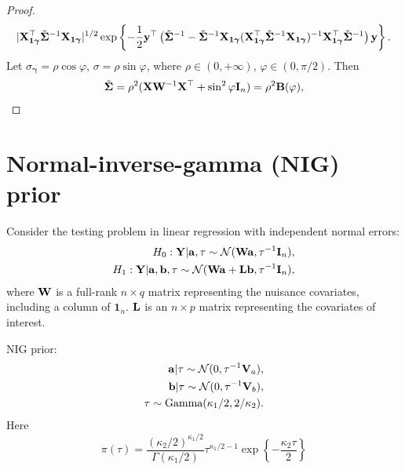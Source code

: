 \documentclass[11pt]{article}
\newcommand{\Ba}{\mathbf{a}}    \newcommand{\Bb}{\mathbf{b}}    \newcommand{\Bc}{\mathbf{c}}    \newcommand{\Bd}{\mathbf{d}}    \newcommand{\Be}{\mathbf{e}}    \newcommand{\Bf}{\mathbf{f}}    \newcommand{\Bg}{\mathbf{g}}    \newcommand{\Bh}{\mathbf{h}}    \newcommand{\Bi}{\mathbf{i}}    \newcommand{\Bj}{\mathbf{j}}    \newcommand{\Bk}{\mathbf{k}}    \newcommand{\Bl}{\mathbf{l}}
\newcommand{\By}{\mathbf{y}}    \newcommand{\Bz}{\mathbf{z}}
\newcommand{\BY}{\mathbf{Y}}    \newcommand{\BZ}{\mathbf{Z}}
\newcommand{\bfsym}[1]{\ensuremath{\boldsymbol{#1}}}
\def\bgamma{\bfsym \gamma}             \def\bGamma{\bfsym \Gamma}
\theoremstyle{plain}
\theoremstyle{definition}
\theoremstyle{remark}
\begin{document}
\begin{proof}
\begin{equation*}
\begin{split}
{|\BX_{\mathbf 1 \bgamma}^\top \tilde\bSigma^{-1} \BX_{\mathbf 1 \bgamma}|^{1/2}
}
\exp\left\{
    -\frac 1 2 
    \By^\top \left(
        \tilde\bSigma^{-1} -\tilde\bSigma^{-1} \BX_{\mathbf 1 \bgamma} (\BX_{\mathbf 1 \bgamma}^\top \tilde\bSigma^{-1} \BX_{\mathbf 1 \bgamma})^{-1} \BX_{\mathbf 1 \bgamma}^\top \tilde\bSigma^{-1}
    \right)\By
\right\}.
        \end{split}
    \end{equation*}
    Let $\sigma_{\bgamma}=\rho \cos \varphi$, $\sigma=\rho \sin \varphi$, where $\rho\in (0,+\infty)$, $\varphi\in (0,\pi/2)$.
    Then
    \begin{align*}
        \tilde{\bSigma}&=\rho^2 (\BX  \BW^{-1} \BX^\top +\sin^2 \varphi \BI_n)
        =\rho^2 \BB(\varphi),\\
    \end{align*}
\end{proof}









\section{Normal-inverse-gamma (NIG) prior}
\cite{zhou2018On}

Consider the testing problem in linear regression with independent normal errors:
\begin{equation*}
    \begin{split}
    H_0:
    \BY|\Ba,\tau \sim \mathcal N (\BW \Ba,\tau^{-1}\BI_n),
    \\
    H_1:
    \BY|\Ba,\Bb, \tau \sim \mathcal N (\BW \Ba + \BL \Bb, \tau^{-1} \BI_n),
    \end{split}
\end{equation*}
where $\mathbf{W}$ is a full-rank $n\times q$ matrix representing the nuisance covariates, including a column of $\mathbf 1_n$.
$\mathbf{L}$ is an $n\times p$ matrix representing the covariates of interest.

NIG prior:
\begin{equation*}
    \begin{split}
        \Ba | \tau \sim \mathcal N (0, \tau^{-1} \BV_a),
        \\
        \Bb | \tau \sim \mathcal N (0, \tau^{-1} \BV_b),
        \\
        \tau \sim \text{Gamma} (\kappa_1/2,2/\kappa_2)
        .
    \end{split}
\end{equation*}
Here
\begin{equation*}
        \pi(\tau) =\frac{(\kappa_2/2)^{\kappa_1/2}}{\Gamma (\kappa_1/2)}
        \tau^{\kappa_1/2-1} \exp\left\{-\frac{\kappa_2 \tau}{2}\right\}
\end{equation*}
\end{document}
